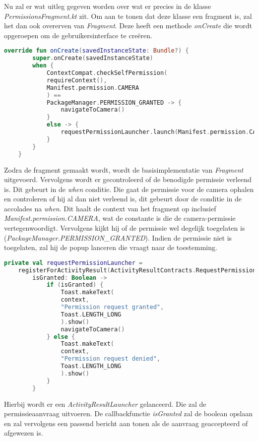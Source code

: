 Nu zal er wat uitleg gegeven worden over wat er precies in de klasse \emph{PermissionsFragment.kt} zit. Om aan te tonen dat deze klasse een fragment is, zal het dan ook overerven van \emph{Fragment}. Deze heeft een methode \emph{onCreate} die wordt opgeroepen om de gebruikersinterface te creëren.
\begin{lstlisting}[language=Kotlin,caption=override fun onCreate(savedInstanceState: Bundle?) in PermissionsFragment.kt, label={lst:onCreatePermissions}]
    override fun onCreate(savedInstanceState: Bundle?) {
        super.onCreate(savedInstanceState)
        when {
            ContextCompat.checkSelfPermission(
            requireContext(),
            Manifest.permission.CAMERA
            ) ==
            PackageManager.PERMISSION_GRANTED -> {
                navigateToCamera()
            }
            else -> {
                requestPermissionLauncher.launch(Manifest.permission.CAMERA)
            }
        }
    }
\end{lstlisting}
Zodra de fragment gemaakt wordt, wordt de basisimplementatie van \emph{Fragment} uitgevoerd. Vervolgens wordt er gecontroleerd of de benodigde permissie verleend is. Dit gebeurt in de \emph{when} conditie. Die gaat de permissie voor de camera ophalen en controleren of hij al dan niet verleend is, dit gebeurt door de conditie in de accolades na \emph{when}. Dit haalt de context van het fragment op inclusief \emph{Manifest.permission.CAMERA}, wat de constante is die de camera-permissie vertegenwoordigt. Vervolgens kijkt hij of de permissie wel degelijk toegelaten is (\emph{PackageManager.PERMISSION\_GRANTED}). Indien de permissie niet is toegelaten, zal hij de popup lanceren die vraagt naar de toestemming.

\begin{lstlisting}[language=Kotlin, caption=requestPermissionLauncher in PermissionsFragment.kt, label={lst:requestPermissionLauncher}]
    private val requestPermissionLauncher =
    registerForActivityResult(ActivityResultContracts.RequestPermission()) { 
        isGranted: Boolean ->
            if (isGranted) {
                Toast.makeText(
                context,
                "Permission request granted",
                Toast.LENGTH_LONG
                ).show()
                navigateToCamera()
            } else {
                Toast.makeText(
                context,
                "Permission request denied",
                Toast.LENGTH_LONG
                ).show()
            }
        }
\end{lstlisting}
Hierbij wordt er een \emph{ActivityResultLauncher} gelanceerd. Die zal de permissieaanvraag uitvoeren. De callbackfunctie \emph{isGranted} zal de boolean opslaan en zal vervolgens een passend bericht aan tonen als de aanvraag geaccepteerd of afgewezen is.


